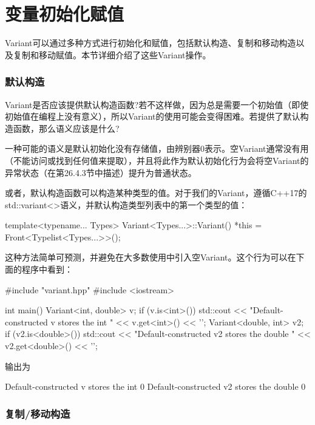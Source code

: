 \section{变量初始化赋值}
Variant可以通过多种方式进行初始化和赋值，包括默认构造、复制和移动构造以及复制和移动赋值。本节详细介绍了这些Variant操作。

\subsubsection{默认构造}

Variant是否应该提供默认构造函数?若不这样做，因为总是需要一个初始值（即使初始值在编程上没有意义），所以Variant的使用可能会变得困难。若提供了默认构造函数，那么语义应该是什么?

一种可能的语义是默认初始化没有存储值，由辨别器0表示。空Variant通常没有用（不能访问或找到任何值来提取），并且将此作为默认初始化行为会将空Variant的异常状态（在第26.4.3节中描述）提升为普通状态。

或者，默认构造函数可以构造某种类型的值。对于我们的Variant，遵循C++17的std::variant<>语义，并默认构造类型列表中的第一个类型的值：

\begin{cpp}
template<typename... Types>
Variant<Types...>::Variant() {
	*this = Front<Typelist<Types...>>();
}
\end{cpp}

这种方法简单可预测，并避免在大多数使用中引入空Variant。这个行为可以在下面的程序中看到：

\begin{cpp}
#include "variant.hpp"
#include <iostream>

int main() {
	Variant<int, double> v;
	if (v.is<int>()) {
		std::cout << "Default-constructed v stores the int "
		<< v.get<int>() << '\n';
	}
	Variant<double, int> v2;
	if (v2.is<double>()) {
		std::cout << "Default-constructed v2 stores the double "
				<< v2.get<double>() << '\n';
	}
}
\end{cpp}

输出为

\begin{shell}
Default-constructed v stores the int 0
Default-constructed v2 stores the double 0
\end{shell}

\subsubsection{复制/移动构造}

